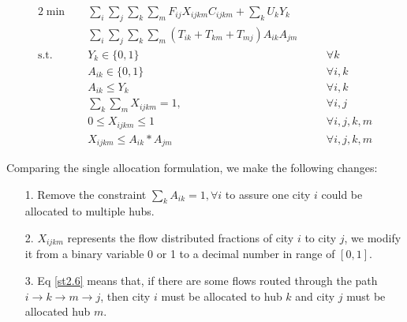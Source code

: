 \documentclass{llncs}
\begin{document}
	\begin{alignat}{2}
	\min\quad
	& \sum_{i}\sum_{j}\sum_{k}\sum_{m}F_{ij}  X_{ijkm} C_{ijkm} + \sum_{k}U_k Y_{k} & & \nonumber\\
	\quad& \sum_{i}\sum_{j}\sum_{k}\sum_{m}{(T_{ik}+ T_{km}+ T_{mj} ) A_{ik} A_{jm}}  & & \tag{LP3} \label{lp3}\\
	\mbox{s.t.}  \quad
	&Y_{k} \in \{0,1\} &\quad& \forall k \label{st2.1}\\ 
	&A_{ik} \in \{0,1\} &\quad& \forall i,k \label{st2.2}\\ 
	&A_{ik} \leq Y_{k} &\quad& \forall i,k \label{st2.3}\\
	&\sum_{k}\sum_{m}{X_{ijkm} = 1}, &\quad& \forall i,j \label{st2.4}\\
	& 0 \leq X_{ijkm} \leq 1 &\quad& \forall i,j,k,m \label{st2.5}\\
	&X_{ijkm} \leq A_{ik} * A_{jm} &\quad& \forall i,j,k,m \label{st2.6}
	\end{alignat}
	
	
	Comparing the single allocation formulation, we make the following changes: 
	\begin{itemize}
		\item[1.] Remove the constraint $\sum_{k}{A_{ik}} = 1, \forall i$ to assure one city $i$ could be allocated to multiple hubs.
		\item[2.] $X_{ijkm}$ represents the flow distributed fractions of city $i$ to city $j$, we modify it from a binary variable 0 or 1 to a decimal number in range of $[0,1]$.
		\item[3.] Eq \ref{st2.6} means that, if there are some flows routed through the path $i\rightarrow k \rightarrow m \rightarrow j$, then city $i$ must be allocated to hub $k$ and city $j$ must be allocated hub $m$.
	\end{itemize}
\end{document}
